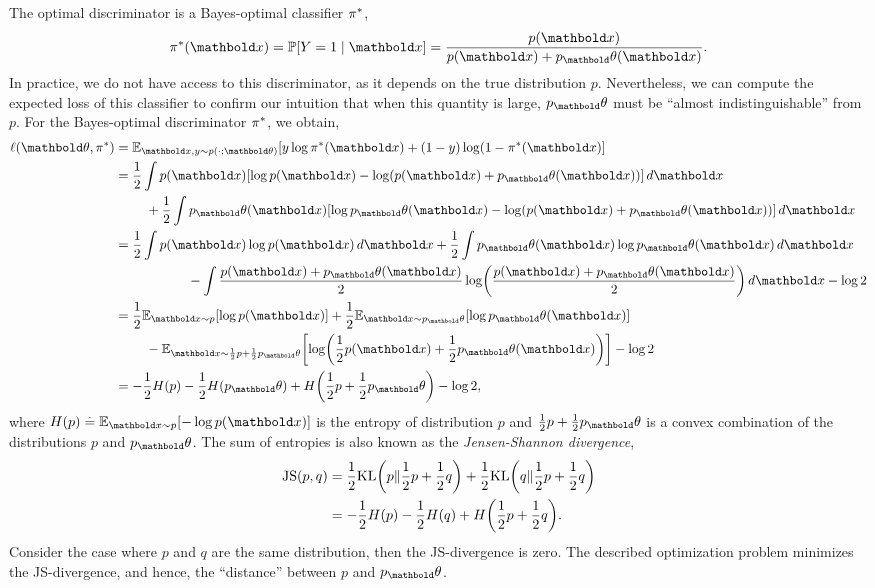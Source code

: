 \documentclass{tufte-handout}
\begin{document}
The optimal discriminator is a Bayes-optimal classifier $\pi^*$, \begin{align}
    \s{\pi}(\vx) = \Pr{Y = 1 \mid \vx} = \frac{p(\vx)}{p(\vx) + p_\vtheta(\vx)}.
\end{align} In practice, we do not have access to this discriminator, as it depends on the true distribution $p$. Nevertheless, we can compute the expected loss of this classifier to confirm our intuition that when this quantity is large, $p_\vtheta$ must be ``almost indistinguishable'' from $p$.  For the Bayes-optimal discriminator $\pi^*$, we obtain, \begin{align}
    \ell(\vtheta, \s{\pi}) &= \E[\vx, y \sim p(\cdot; \vtheta)]{y \log \s{\pi}(\vx) + (1-y) \log (1 - \s{\pi}(\vx)} \nonumber\\
    &= \begin{multlined}[t]
        \frac{1}{2} \int p(\vx) [\log p(\vx) - \log(p(\vx) + p_\vtheta(\vx))] \,d\vx \\ + \frac{1}{2} \int p_\vtheta(\vx) [\log p_\vtheta(\vx) - \log(p(\vx) + p_\vtheta(\vx))] \,d\vx
    \end{multlined} \nonumber\\
    &= \begin{multlined}[t]
        \frac{1}{2} \int p(\vx) \log p(\vx) \,d\vx + \frac{1}{2} \int p_\vtheta(\vx) \log p_\vtheta(\vx) \,d\vx \\ - \int \frac{p(\vx) + p_\vtheta(\vx)}{2} \log\parentheses*{\frac{p(\vx) + p_\vtheta(\vx)}{2}} \,d\vx - \log 2
    \end{multlined} \nonumber\\
    &= \begin{multlined}[t]
        \frac{1}{2} \E[\vx \sim p]{\log p(\vx)} + \frac{1}{2} \E[\vx \sim p_\vtheta]{\log p_\vtheta(\vx)} \\ - \E[\vx \sim \frac{1}{2}p + \frac{1}{2}p_\vtheta]{\log\parentheses*{\frac{1}{2}p(\vx) + \frac{1}{2}p_\vtheta(\vx)}} - \log 2
    \end{multlined} \nonumber\\
    &= - \frac{1}{2} H(p) - \frac{1}{2} H(p_\vtheta) + H\parentheses*{\frac{1}{2}p + \frac{1}{2}p_\vtheta} - \log 2,
\end{align} where $H(p) \defeq \E[\vx \sim p]{- \log p(\vx)}$ is the entropy of distribution $p$ and $\frac{1}{2}p + \frac{1}{2}p_\vtheta$ is a convex combination of the distributions $p$ and $p_\vtheta$. The sum of entropies is also known as the \emph{Jensen-Shannon divergence}, \begin{align}
    \JS{p, q} &= \frac{1}{2} \KL{p}{\frac{1}{2}p + \frac{1}{2}q} + \frac{1}{2} \KL{q}{\frac{1}{2}p + \frac{1}{2}q} \\
    &= - \frac{1}{2} H(p) - \frac{1}{2} H(q) + H\parentheses*{\frac{1}{2}p + \frac{1}{2}q}.
\end{align} Consider the case where $p$ and $q$ are the same distribution, then the JS-divergence is zero. The described optimization problem minimizes the JS-divergence, and hence, the ``distance'' between $p$ and $p_\vtheta$.
\end{document}
